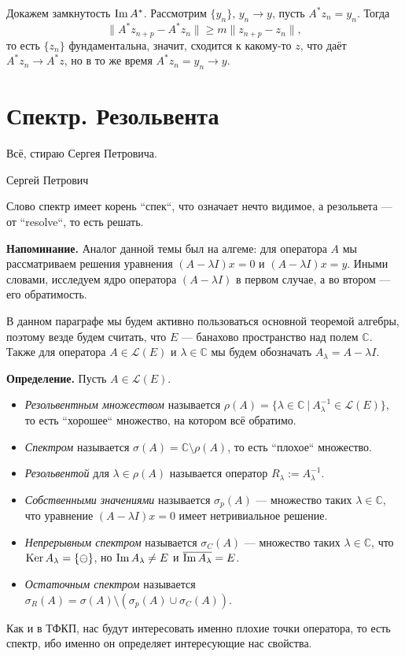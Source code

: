 Докажем замкнутость $\operatorname{Im} A^*$.
Рассмотрим $\{y_n\}$, $y_n \to y$, пусть $A^* z_n = y_n$.
Тогда
\[
    \|A^* z_{n + p} - A^* z_n\| \ge m \|z_{n + p} - z_n\|,
\]
то есть $\{z_n\}$ фундаментальна, значит, сходится к какому-то $z$, что даёт $A^* z_n \to A^*z$, но в то же время $A^* z_n = y_n \to y$.

\QED

\section{Спектр. Резольвента}
\epigraph{Всё, стираю Сергея Петровича.}{Сергей Петрович}
Слово спектр имеет корень ``спек``, что означает нечто видимое, а резольвета --- от ``resolve``, то есть решать.

\textbf{Напоминание.} Аналог данной темы был на алгеме: для оператора $A$ мы рассматриваем решения уравнения $(A - \lambda I) x = 0$ и $(A - \lambda I) x = y$.
Иными словами, исследуем ядро оператора $(A - \lambda I)$ в первом случае, а во втором --- его обратимость.

В данном параграфе мы будем активно пользоваться основной теоремой алгебры, поэтому везде будем считать, что $E$ --- банахово пространство над полем $\mathbb C$.
Также для оператора $A \in \mathcal L(E)$ и $\lambda \in \mathbb C$ мы будем обозначать $A_\lambda = A - \lambda I$.

\textbf{Определение.} Пусть $A \in \mathcal L(E)$.
\begin{itemize}
    \item \textit{Резольвентным множеством} называется $\rho(A) = \{\lambda \in \mathbb C~|~A_\lambda^{-1} \in \mathcal L(E)\}$, то есть ``хорошее`` множество, на котором всё обратимо.
    \item \textit{Спектром} называется $\sigma(A) = \mathbb C \setminus \rho(A)$, то есть ``плохое`` множество.
    \item \textit{Резольвентой} для $\lambda \in \rho(A)$ называется оператор $R_\lambda := A_\lambda^{-1}$.
    \item \textit{Собственными значениями} называется $\sigma_p(A)$ --- множество таких $\lambda \in \mathbb C$, что уравнение $(A - \lambda I) x = 0$ имеет нетривиальное решение.
    \item \textit{Непрерывным спектром} называется $\sigma_C(A)$ --- множество таких $\lambda \in \mathbb C$, что $\operatorname{Ker} A_\lambda = \{\ominus\}$, но $\operatorname{Im} A_\lambda \ne E$ и $\overline{\operatorname{Im} A_\lambda} = E$.
    \item \textit{Остаточным спектром} называется $\sigma_R(A) = \sigma(A) \setminus (\sigma_p(A) \cup \sigma_C(A))$.
\end{itemize}
Как и в ТФКП, нас будут интересовать именно плохие точки оператора, то есть спектр, ибо именно он определяет интересующие нас свойства.

